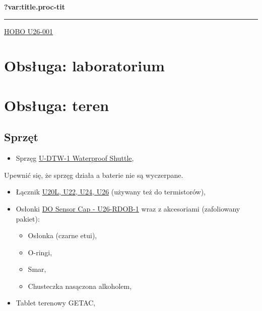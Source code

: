 \documentclass[
  letterpaper,
  DIV=11,
  numbers=noendperiod]{scrreprt}
\providecommand{\tightlist}{%
  \setlength{\itemsep}{0pt}\setlength{\parskip}{0pt}}\usepackage{longtable,booktabs,array}
\begin{document}
\textbf{?var:title.proc-tit}

\begin{center}\rule{0.5\linewidth}{0.5pt}\end{center}

\href{https://www.onsetcomp.com/products/data-loggers/u26-001}{HOBO
U26-001}

\hypertarget{obsux142uga-laboratorium}{%
\section{Obsługa: laboratorium}\label{obsux142uga-laboratorium}}

\hypertarget{obsux142uga-teren}{%
\section{Obsługa: teren}\label{obsux142uga-teren}}

\hypertarget{sprzux119t}{%
\subsection{Sprzęt}\label{sprzux119t}}

\begin{itemize}
\tightlist
\item
  Sprzęg
  \href{https://www.onsetcomp.com/products/communications/u-dtw-1}{U-DTW-1
  Waterproof Shuttle},
\end{itemize}

\begin{tcolorbox}[enhanced jigsaw, toptitle=1mm, bottomtitle=1mm, opacitybacktitle=0.6, colframe=quarto-callout-important-color-frame, bottomrule=.15mm, title=\textcolor{quarto-callout-important-color}{\faExclamation}\hspace{0.5em}{Bateria}, colbacktitle=quarto-callout-important-color!10!white, left=2mm, breakable, rightrule=.15mm, colback=white, opacityback=0, arc=.35mm, coltitle=black, leftrule=.75mm, toprule=.15mm, titlerule=0mm]

Upewnić się, że sprzęg działa a baterie nie są wyczerpane.

\end{tcolorbox}

\begin{itemize}
\tightlist
\item
  Łącznik
  \href{https://www.onsetcomp.com/products/replacements/coupler2-c}{U20L,
  U22, U24, U26} (używany też do termistorów),
\item
  Osłonki
  \href{https://www.onsetcomp.com/products/replacements/u26-rdob-1}{DO
  Sensor Cap - U26-RDOB-1} wraz z akcesoriami (zafoliowany pakiet):

  \begin{itemize}
  \tightlist
  \item
    Osłonka (czarne etui),
  \item
    O-ringi,
  \item
    Smar,
  \item
    Chusteczka nasączona alkoholem,
  \end{itemize}
\item
  Tablet terenowy GETAC,
\end{itemize}
\end{document}
